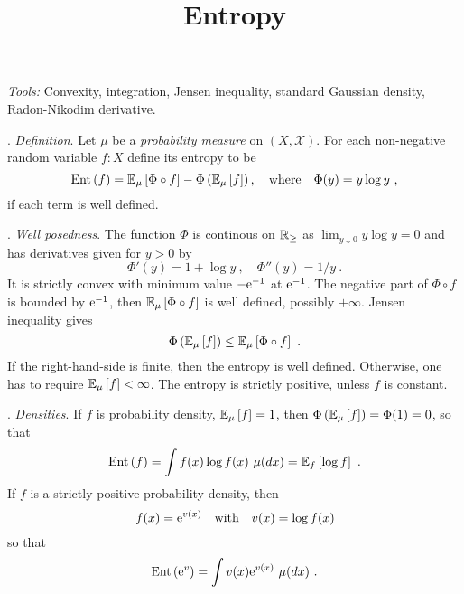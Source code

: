 \documentclass[12pt,a4paper]{amsart}
\title{Entropy}
\renewcommand{\entropyof}[1]{\operatorname{Ent}\left(#1\right)}
\begin{document}
\maketitle
\noindent\emph{Tools:} Convexity, integration, Jensen inequality, standard Gaussian density, Radon-Nikodim derivative.

\bigskip

. \emph{Definition}. Let $\mu$ be a \emph{probability measure} on
$(X,\mathcal X)$. For each non-negative random variable $f \colon X$
define its entropy to be
\begin{equation*}
  \entropyof{f} = \expectat \mu {\Phi\circ f} - \Phi\left(\expectat
    \mu f\right), \quad \text{where} \quad \Phi(y) = y \log y \ ,
\end{equation*}
if each term is well defined.

. \emph{Well posedness}. The function $\Phi$ is continous
on $\mathbb{R}_\geq$ as $\lim_{y \downarrow 0} y \log y = 0$ and has
derivatives given for $y > 0$ by
\begin{equation*}
  \Phi'(y) = 1 + \log y \ , \quad \Phi''(y)= 1/y \ .  
\end{equation*}
It is strictly convex with minimum value $-\mathrm{e}^{-1}$ at
$\mathrm{e}^{-1}$. The negative part of $\Phi\circ f$ is bounded by
$\mathrm{e}^{-1}$, then $\operatorname{\mathbb E}_{\mu}\left[\Phi\circ f\right]$ is well defined,
possibly $+\infty$. Jensen inequality gives
\begin{equation*}
  \Phi\left(\operatorname{\mathbb E}_{\mu}\left[f\right]\right) \leq \operatorname{\mathbb E}_{\mu}\left[\Phi\circ f\right] \ .
\end{equation*}
If the right-hand-side is finite, then the entropy is well
defined. Otherwise, one has to require $\operatorname{\mathbb E}_{\mu}\left[f\right] < \infty$. The
entropy is strictly positive, unless $f$ is constant.

. \emph{Densities}. If $f$ is probability density,
$\operatorname{\mathbb E}_{\mu}\left[f\right] = 1$, then $\Phi\left(\operatorname{\mathbb E}_{\mu}\left[f\right]\right) =
\Phi(1) = 0$, so that
\begin{equation*}
  \entropyof f = \int f(x) \log f(x) \ \mu(dx) = \expectat f {\log f}
  \ .
\end{equation*}
If $f$ is a strictly positive probability density, then
\begin{equation*}
  f(x) = \mathrm{e}^{v(x)} \quad \text{with} \quad v(x) = \log f(x)
\end{equation*}
so that
\begin{equation*}
  \entropyof{\euler^{v}} = \int v(x) \euler^{v(x)} \ \mu(dx) \ .
\end{equation*}
\end{document}

